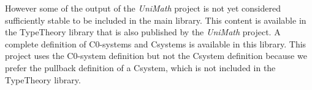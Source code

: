 However some of the output of the \textit{UniMath} project is not yet considered
sufficiently stable to be included in the main library. This content is
available in the TypeTheory library that is also published by the
\textit{UniMath} project. A complete definition of C0-systems and Csystems is
available in this library. This project uses the C0-system definition but not
the Csystem definition because we prefer the pullback definition of a Csystem,
which is not included in the TypeTheory library.